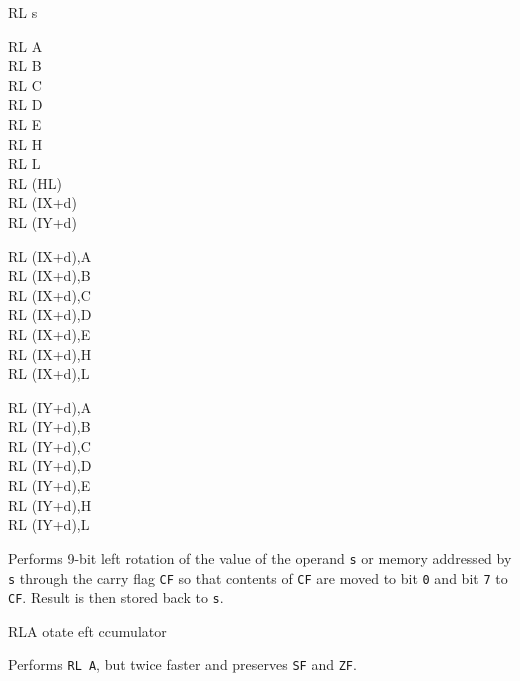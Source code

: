 \begin{basedescript}{
	\desclabelstyle{\multilinelabel}
	\desclabelwidth{3cm}}
\begin{DetailItem}{RL s}
		\begin{DetailVariants}
			RL A\\
			RL B\\
			RL C\\
			RL D\\
			RL E\\
			RL H\\
			RL L\\
			RL (HL)\\
			RL (IX+d)\\
			RL (IY+d)

			\columnbreak
			RL (IX+d),A\UNDOC\\
			RL (IX+d),B\UNDOC\\
			RL (IX+d),C\UNDOC\\
			RL (IX+d),D\UNDOC\\
			RL (IX+d),E\UNDOC\\
			RL (IX+d),H\UNDOC\\
			RL (IX+d),L\UNDOC

			\columnbreak
			RL (IY+d),A\UNDOC\\
			RL (IY+d),B\UNDOC\\
			RL (IY+d),C\UNDOC\\
			RL (IY+d),D\UNDOC\\
			RL (IY+d),E\UNDOC\\
			RL (IY+d),H\UNDOC\\
			RL (IY+d),L\UNDOC
		\end{DetailVariants}

		Performs 9-bit left rotation of the value of the operand {\tt s} or memory addressed by {\tt s} through the carry flag {\tt CF} so that contents of {\tt CF} are moved to bit {\tt 0} and bit {\tt 7} to {\tt CF}. Result is then stored back to {\tt s}.

		\begin{DetailEffects}[p]
			\FlagsRLr
		\end{DetailEffects}
						
		\begin{DetailTiming}
		\end{DetailTiming}

	\end{DetailItem}

	\pagebreak
	\begin{DetailItem}{RLA}
		{otate eft ccumulator}
		{}

		Performs {\tt RL A}, but twice faster and preserves {\tt SF} and {\tt ZF}.


\end{DetailItem}
\end{basedescript}
